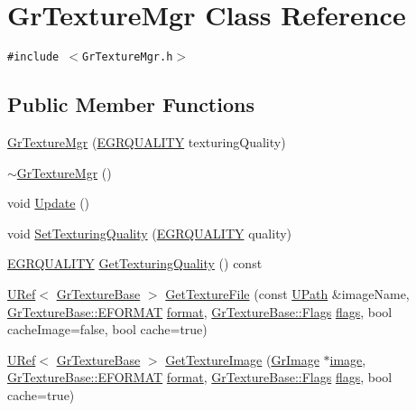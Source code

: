 \hypertarget{class_gr_texture_mgr}{
\section{GrTextureMgr Class Reference}
\label{class_gr_texture_mgr}
}
{\tt \#include $<$GrTextureMgr.h$>$}

\subsection*{Public Member Functions}
\begin{CompactItemize}
\item 
\hyperlink{class_gr_texture_mgr_e876dc2f946618034891e7d0481859c7}{GrTextureMgr} (\hyperlink{enums_8h_697c1ee1354746841860d5bf9f81c033}{EGRQUALITY} texturingQuality)
\item 
\hyperlink{class_gr_texture_mgr_f3605c16cc8ce7bcff1d83e199eb1740}{$\sim$GrTextureMgr} ()
\item 
void \hyperlink{class_gr_texture_mgr_791f429e9ba38f366812e5258e27ed2d}{Update} ()
\item 
void \hyperlink{class_gr_texture_mgr_de4ad2113d60ada7c4e178b0e752a45d}{SetTexturingQuality} (\hyperlink{enums_8h_697c1ee1354746841860d5bf9f81c033}{EGRQUALITY} quality)
\item 
\hyperlink{enums_8h_697c1ee1354746841860d5bf9f81c033}{EGRQUALITY} \hyperlink{class_gr_texture_mgr_b9120a416ac73224fe76245e7083db19}{GetTexturingQuality} () const 
\item 
\hyperlink{class_u_ref}{URef}$<$ \hyperlink{class_gr_texture_base}{GrTextureBase} $>$ \hyperlink{class_gr_texture_mgr_42a8622f0332de231fcabe925bf06b21}{GetTextureFile} (const \hyperlink{class_u_path}{UPath} \&imageName, \hyperlink{class_gr_texture_base_82c606022e93566ba55fe4cd3beb687c}{GrTextureBase::EFORMAT} \hyperlink{glext__bak_8h_e2d3db041c6004a67047659b42f73a44}{format}, \hyperlink{class_gr_texture_base_bee6ecbc7a70ea5f2acab8341a9696b5}{GrTextureBase::Flags} \hyperlink{_u_t_message_8h_0a3c0b351ab09281b662a9ff4f900a53}{flags}, bool cacheImage=false, bool cache=true)
\item 
\hyperlink{class_u_ref}{URef}$<$ \hyperlink{class_gr_texture_base}{GrTextureBase} $>$ \hyperlink{class_gr_texture_mgr_a488c8b7fc80b98be3f6242b2e7365f4}{GetTextureImage} (\hyperlink{class_gr_image}{GrImage} $\ast$\hyperlink{glext__bak_8h_8943555672bc4b8056204eb92329cafa}{image}, \hyperlink{class_gr_texture_base_82c606022e93566ba55fe4cd3beb687c}{GrTextureBase::EFORMAT} \hyperlink{glext__bak_8h_e2d3db041c6004a67047659b42f73a44}{format}, \hyperlink{class_gr_texture_base_bee6ecbc7a70ea5f2acab8341a9696b5}{GrTextureBase::Flags} \hyperlink{_u_t_message_8h_0a3c0b351ab09281b662a9ff4f900a53}{flags}, bool cache=true)

\end{CompactItemize}
